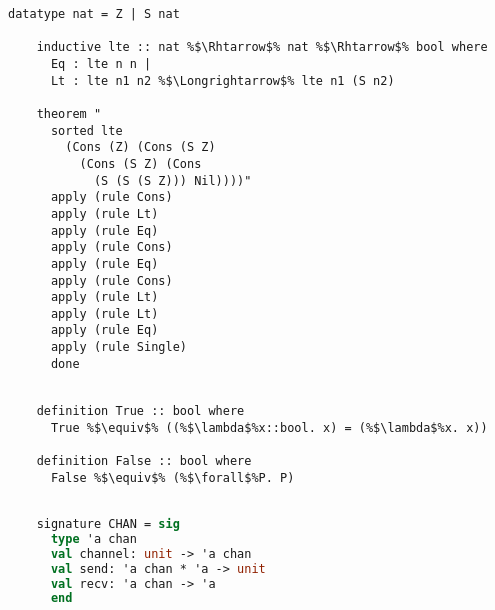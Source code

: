 \documentclass{article}
\begin{document}
    
  \begin{lstlisting}[style=codestyle1, escapechar=\%]
    datatype nat = Z | S nat 

    inductive lte :: nat %$\Rhtarrow$% nat %$\Rhtarrow$% bool where
      Eq : lte n n |
      Lt : lte n1 n2 %$\Longrightarrow$% lte n1 (S n2)

    theorem "
      sorted lte
        (Cons (Z) (Cons (S Z)
          (Cons (S Z) (Cons
            (S (S (S Z))) Nil))))"
      apply (rule Cons)
      apply (rule Lt)
      apply (rule Eq)
      apply (rule Cons)
      apply (rule Eq)
      apply (rule Cons)
      apply (rule Lt)
      apply (rule Lt)
      apply (rule Eq)
      apply (rule Single)
      done
    \end{lstlisting}

  \begin{lstlisting}[style=codestyle1, escapechar=\%]

    definition True :: bool where 
      True %$\equiv$% ((%$\lambda$%x::bool. x) = (%$\lambda$%x. x))

    definition False :: bool where 
      False %$\equiv$% (%$\forall$%P. P)

    \end{lstlisting}

  \begin{lstlisting}[language=ML, style=codestyle1]

    signature CHAN = sig
      type 'a chan 
      val channel: unit -> 'a chan
      val send: 'a chan * 'a -> unit
      val recv: 'a chan -> 'a
      end     
  \end{lstlisting}
\end{document}
